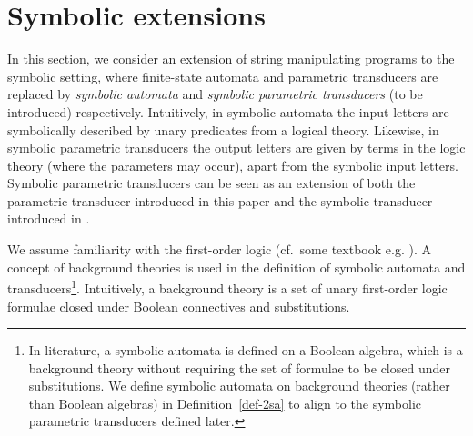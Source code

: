 
\section{Symbolic extensions}
\label{sec:symbolic}

In this section, we consider an extension of string manipulating programs to the symbolic setting, where finite-state automata and parametric transducers are replaced by \emph{symbolic automata} \cite{NG01,DV14} and \emph{symbolic parametric transducers} (to be introduced) respectively.
%
Intuitively, in symbolic automata %
the input letters are symbolically described by unary predicates from a  logical theory. %
%
Likewise, in symbolic parametric transducers %
the output letters are given by terms in the logic theory (where the parameters may occur),  apart from the symbolic input letters. Symbolic parametric transducers can be seen as an extension of both the parametric transducer introduced in this paper and the symbolic transducer introduced in \cite{VHLMB12}.


We assume familiarity with the 
first-order logic (cf.\ some textbook e.g. \cite{EFT94}).
A concept of background theories is used in the definition of symbolic automata and transducers\footnote{In literature, a symbolic automata is defined on a Boolean algebra, which is a background theory without requiring the set of formulae to be closed under substitutions. We define symbolic automata on background theories (rather than Boolean algebras) in Definition~\ref{def-2sa} to align to the symbolic parametric transducers defined later.}.
Intuitively, 
a  background theory is a set of unary first-order logic formulae closed under Boolean connectives and substitutions. 
 
